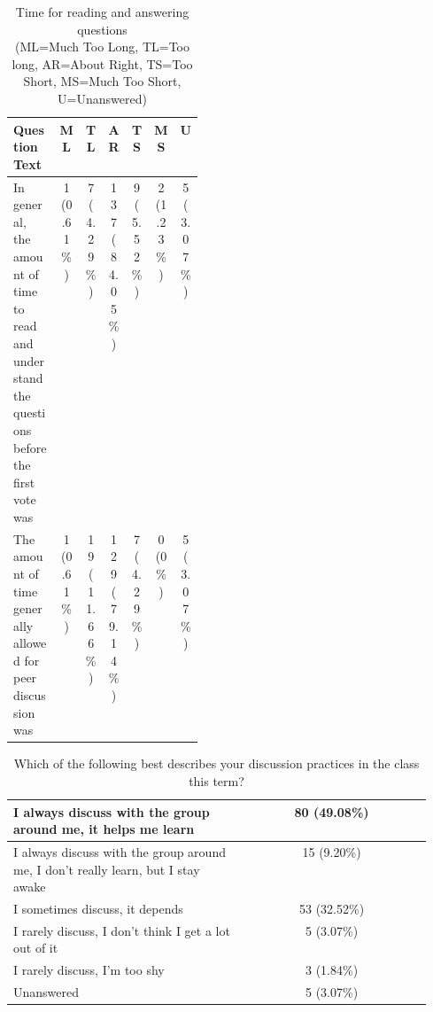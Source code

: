 \documentclass[12pt]{article}
\begin{document}
\begin{table}[ht]
\label{table:timeForQuestions}
\begin{tabular}{p{0.25\linewidth} |c|c|c|c|c|c} %
\toprule
Question Text & ML & TL & AR & TS & MS & U \\ \midrule
\rowcolor{LightGray}%
In general, the amount of time to read and understand the questions before the first vote was 
& \specialcell{  1 \\ (0.61\%) }
& \specialcell{ 7 \\ (4.29\%) }
& \specialcell{ 137 \\ (84.05\%) }
& \specialcell{ 9 \\ (5.52\%) }
& \specialcell{ 2 \\ (1.23\%) }
& \specialcell{ 5 \\ (3.07\%) }
\\ \midrule %
The amount of time generally allowed for peer discussion was 
& \specialcell{1 \\(0.61\%) }
& \specialcell{19 \\(11.66\%) } 
& \specialcell{129 \\(79.14\%) } 
& \specialcell{7 \\(4.29\%) }
& \specialcell{0 \\(0\%) }
& \specialcell{5 \\(3.07\%) }\\ \bottomrule
\end{tabular}
\caption{Time for reading and answering questions\\\hspace{\textwidth} (ML=Much Too Long, TL=Too long, AR=About Right, TS=Too Short, MS=Much Too Short, U=Unanswered)}
\end{table}

\begin{table}[ht]
\label{table:groupDiscussion}
\begin{tabular}{p{0.55\linewidth}|c} %
\toprule
 \rowcolor{LightGray}  %
 I always discuss with the group around me, it helps me learn 
 & 80 (49.08\%)\\\midrule 
 I always discuss with the group around me, I don't really learn, but I stay awake 
 & 15 (9.20\%)\\\midrule 
 \rowcolor{LightGray}
 I sometimes discuss, it depends 
 & 53 (32.52\%)\\\midrule 
 I rarely discuss, I don't think I get a lot out of it 
 & 5 (3.07\%)\\\midrule 
 \rowcolor{LightGray}
 I rarely discuss, I'm too shy 
 & 3 (1.84\%)\\\midrule 
 Unanswered 
 & 5 (3.07\%)\\\bottomrule 
\end{tabular}
\caption{Which of the following best describes your discussion practices in the class this term?}
\end{table}
\end{document}
